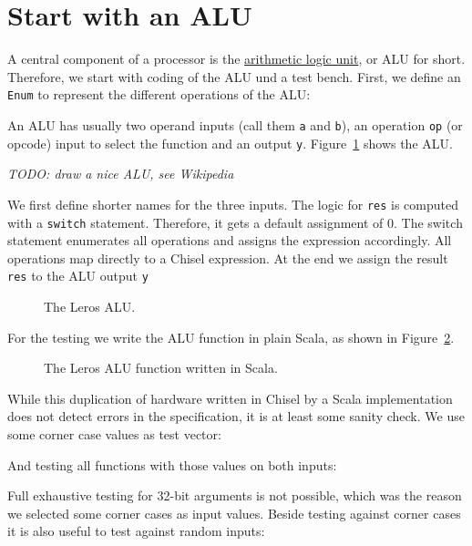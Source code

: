 \documentclass[%
    10pt, %
    headinclude, footexclude,
    openright, %
    notitlepage,
    cleardoubleempty,
    headsepline,
    pointlessnumbers,
    bibtotoc, idxtotoc,
    ]{scrbook}
\newcommand{\code}[1]{{\small{\texttt{#1}}}}
\newcommand{\todo}[1]{{\emph{TODO: #1}}}
\newcommand{\myref}[2]{\href{#1}{#2}}
\begin{document}
\section{Start with an ALU}

A central component of a processor is the
\myref{https://en.wikipedia.org/wiki/Arithmetic_logic_unit}{arithmetic logic unit}, or ALU for short.
Therefore, we start with coding of the ALU und a test bench.
First, we define an \code{Enum} to represent the different operations of the ALU:



\noindent An ALU has usually two operand inputs (call them \code{a} and \code{b}), an operation \code{op}
(or opcode) input to select the function and an output \code{y}.
Figure~\ref{fig:leros-alu} shows the ALU.

\todo{draw a nice ALU, see Wikipedia}

We first define shorter names for the three inputs. The logic for \code{res} is computed
with a \code{switch} statement. Therefore, it gets a default assignment of 0.
The switch statement enumerates all operations and assigns the expression accordingly.
All operations map directly to a Chisel expression.
At the end we assign the result \code{res} to the ALU output \code{y}

\begin{figure}

\caption{The Leros ALU.}
\label{fig:leros-alu}
\end{figure}

For the testing we write the ALU function in plain Scala, as shown in Figure~\ref{fig:leros-alu-scala}.

\begin{figure}

\caption{The Leros ALU function written in Scala.}
\label{fig:leros-alu-scala}
\end{figure}

\noindent While this duplication of hardware written in Chisel by a Scala implementation does not
detect errors in the specification, it is at least some sanity check.
We use some corner case values as test vector:



\noindent And testing all functions with those values on both inputs:



\noindent Full exhaustive testing for 32-bit arguments is not possible, which was the reason we
selected some corner cases as input values. Beside testing against corner cases it is also useful
to test against random inputs:
\end{document}
